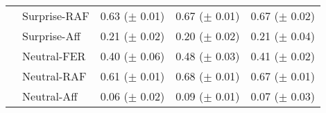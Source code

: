 \documentclass[a4paper, conference]{IEEEtran}
\begin{document}
\begin{table}[htbp]
\begin{center}
\begin{tabular}{>{\raggedleft\arraybackslash}p{0.7cm}p{1.82cm}p{1.55cm}p{1.55cm}p{1.55cm}@{}}
			    & Surprise-RAF & 0.63 ($\pm$ 0.01) & 0.67 ($\pm$ 0.01) & 0.67 ($\pm$ 0.02) \\
			    & Surprise-Aff & 0.21 ($\pm$ 0.02) & 0.20 ($\pm$ 0.02) & 0.21 ($\pm$ 0.04) \\
			\hline %
			641 & Neutral-FER & 0.40 ($\pm$ 0.06) & 0.48 ($\pm$ 0.03) & 0.41 ($\pm$ 0.02) \\
			    & Neutral-RAF & 0.61 ($\pm$ 0.01) & 0.68 ($\pm$ 0.01) & 0.67 ($\pm$ 0.01) \\
			    & Neutral-Aff & 0.06 ($\pm$ 0.02) & 0.09 ($\pm$ 0.01) & 0.07 ($\pm$ 0.03) \\
			\hline
			\hline
		\end{tabular}
		\label{f1_scores_RAF}
	\end{center}
\end{table}
\end{document}
